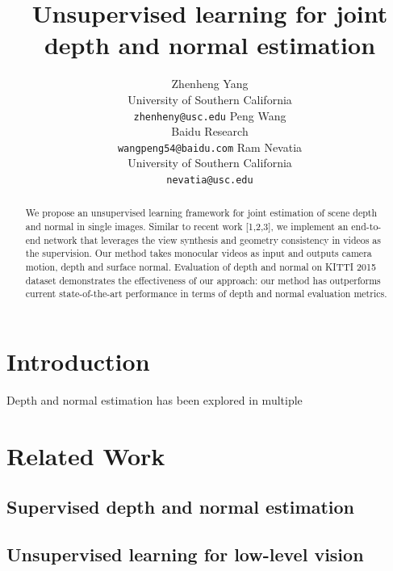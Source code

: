 \documentclass[letterpaper]{article} %
\begin{document}
%
\title{Unsupervised learning for joint depth and normal estimation}
\author{Zhenheng Yang \\
University of Southern California\\
\texttt{zhenheny@usc.edu}
\And 
Peng Wang\\
Baidu Research\\
\texttt{wangpeng54@baidu.com}
\And Ram Nevatia\\
University of Southern California\\
\texttt{nevatia@usc.edu}}

\maketitle
\begin{abstract}
We propose an unsupervised learning framework for joint estimation of scene depth and normal in single images. Similar to recent work [1,2,3], we implement an end-to-end network that leverages the view synthesis and geometry consistency in videos as the supervision. Our method takes monocular videos as input and outputs camera motion, depth and surface normal. Evaluation of depth and normal on KITTI 2015 dataset demonstrates the effectiveness of our approach: our method has outperforms current state-of-the-art performance in terms of depth and normal evaluation metrics.
\end{abstract}

\section{Introduction}

Depth and normal estimation has been explored in multiple 

\section{Related Work}

\subsection{Supervised depth and normal estimation}

\subsection{Unsupervised learning for low-level vision}
\end{document}
